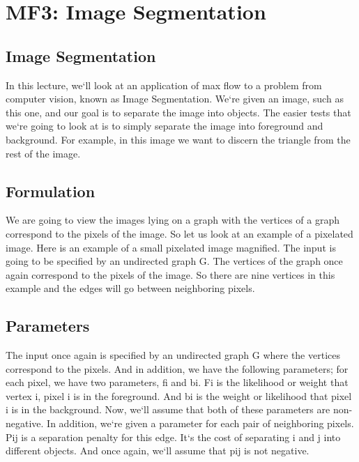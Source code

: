 \section{MF3: Image Segmentation}

\subsection{Image Segmentation}
In this lecture, we`ll look at an application of max flow to a problem from computer vision, known as Image Segmentation.
We`re given an image, such as this one, and our goal is to separate the image into objects.
The easier tests that we`re going to look at is to simply separate the image into foreground and background.
For example, in this image we want to discern the triangle from the rest of the image.

\subsection{Formulation}
We are going to view the images lying on a graph with the vertices of a graph correspond to the pixels of the image.
So let us look at an example of a pixelated image.
Here is an example of a small pixelated image magnified.
The input is going to be specified by an undirected graph G\@.
The vertices of the graph once again correspond to the pixels of the image.
So there are nine vertices in this example and the edges will go between neighboring pixels.

\subsection{Parameters}
The input once again is specified by an undirected graph G where the vertices correspond to the pixels.
And in addition, we have the following parameters; for each pixel, we have two parameters, fi and bi.
Fi is the likelihood or weight that vertex i, pixel i is in the foreground.
And bi is the weight or likelihood that pixel i is in the background.
Now, we`ll assume that both of these parameters are non-negative.
In addition, we`re given a parameter for each pair of neighboring pixels.
Pij is a separation penalty for this edge.
It`s the cost of separating i and j into different objects.
And once again, we`ll assume that pij is not negative.

